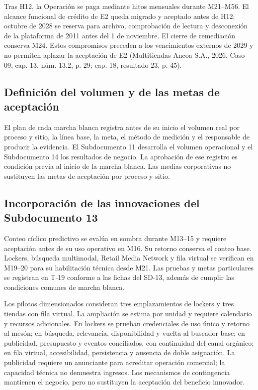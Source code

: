 \documentclass[11pt]{article}
\begin{document}
Tras H12, la Operación se paga mediante hitos mensuales durante M21--M56. El alcance funcional de crédito de E2 queda migrado y aceptado antes de H12; octubre de 2028 se reserva para archivo, comprobación de lectura y desconexión de la plataforma de 2011 antes del 1 de noviembre. El cierre de remediación conserva M24. Estos compromisos preceden a los vencimientos externos de 2029 y no permiten aplazar la aceptación de E2 (Multitiendas Ancoa S.A., 2026, Caso 09, cap. 13, núm. 13.2, p. 29; cap. 18, resultado 23, p. 45).

\subsection*{Definición del volumen y de las metas de aceptación}

El plan de cada marcha blanca registra antes de su inicio el volumen real por proceso y sitio, la línea base, la meta, el método de medición y el responsable de producir la evidencia. El Subdocumento 11 desarrolla el volumen operacional y el Subdocumento 14 los resultados de negocio. La aprobación de ese registro es condición previa al inicio de la marcha blanca. Las medias corporativas no sustituyen las metas de aceptación por proceso y sitio.

\subsection*{Incorporación de las innovaciones del Subdocumento 13}

Conteo cíclico predictivo se evalúa en sombra durante M13–15 y requiere aceptación antes de su uso operativo en M16. Su retorno conserva el conteo base. Lockers, búsqueda multimodal, Retail Media Network y fila virtual se verifican en M19–20 para su habilitación técnica desde M21. Las pruebas y metas particulares se registran en T-19 conforme a las fichas del SD-13, además de cumplir las condiciones comunes de marcha blanca.

Los pilotos dimensionados consideran tres emplazamientos de lockers y tres tiendas con fila virtual. La ampliación se estima por unidad y requiere calendario y recursos adicionales. En lockers se prueban credenciales de uso único y retorno al mesón; en búsqueda, relevancia, disponibilidad y vuelta al buscador base; en publicidad, presupuesto y eventos conciliados, con continuidad del canal orgánico; en fila virtual, accesibilidad, persistencia y ausencia de doble asignación. La publicidad requiere un anunciante para acreditar operación comercial; la capacidad técnica no demuestra ingresos. Los mecanismos de contingencia mantienen el negocio, pero no sustituyen la aceptación del beneficio innovador.
\end{document}
